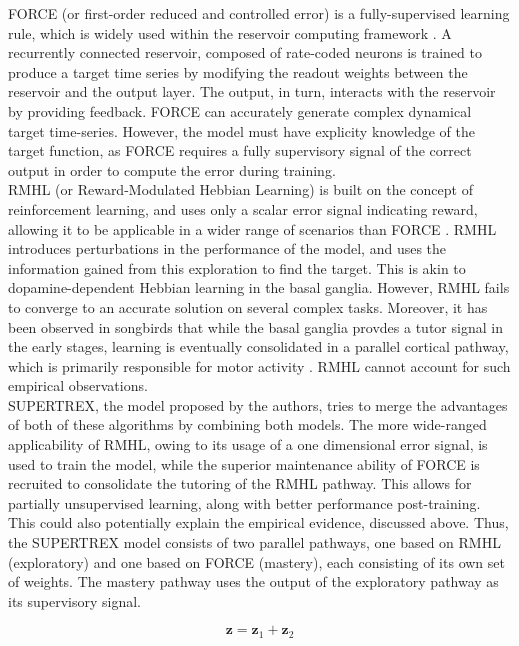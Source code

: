 FORCE (or first-order reduced and controlled error) is a fully-supervised learning rule, which is widely used within the reservoir computing framework \cite{sussillo2009}. A recurrently connected reservoir, composed of rate-coded neurons is trained to produce a target time series by modifying the readout weights between the reservoir and the output layer. The output, in turn, interacts with the reservoir by providing feedback. FORCE can accurately generate complex dynamical target time-series. However, the model must have explicity knowledge of the target function, as FORCE requires a fully supervisory signal of the correct output in order to compute the error during training. \\


RMHL (or Reward-Modulated Hebbian Learning) is built on the concept of reinforcement learning, and uses only a scalar error signal indicating reward, allowing it to be applicable in a wider range of scenarios than FORCE \cite{hoerzer2014}. RMHL introduces perturbations in the performance of the model, and uses the information gained from this exploration to find the target. This is akin to dopamine-dependent Hebbian learning in the basal ganglia. However, RMHL fails to converge to an accurate solution on several complex tasks. Moreover, it has been observed in songbirds that while the basal ganglia provdes a tutor signal in the early stages, learning is eventually consolidated in a parallel cortical pathway, which is primarily responsible for motor activity \cite{olveczky2011}. RMHL cannot account for such empirical observations.\\


SUPERTREX, the model proposed by the authors, tries to merge the advantages of both of these algorithms by combining both models. The more wide-ranged applicability of RMHL, owing to its usage of a one dimensional error signal, is used to train the model, while the superior maintenance ability of FORCE is recruited to consolidate the tutoring of the RMHL pathway. This allows for partially unsupervised learning, along with better performance post-training. This could also potentially explain the empirical evidence, discussed above. Thus, the SUPERTREX model consists of two parallel pathways, one based on RMHL (exploratory) and one based on FORCE (mastery), each consisting of its own set of weights. The mastery pathway uses the output of the exploratory pathway as its supervisory signal.


\begin{equation}
    \mathbf{z}=\mathbf{z}_{1}+\mathbf{z}_{2}
\end{equation}

